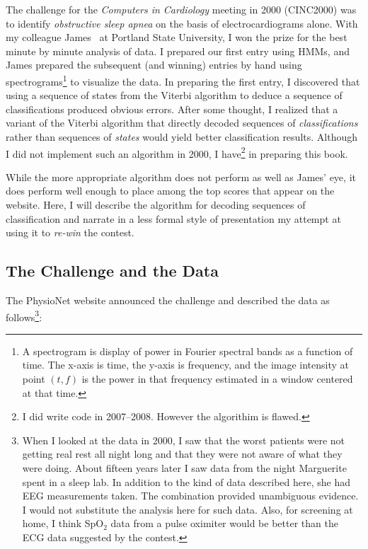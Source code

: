 \documentclass[]{article}
\begin{document}
The challenge for the \emph{Computers in Cardiology} meeting in 2000
(CINC2000) was to
identify \emph{obstructive sleep apnea} on the basis of
electrocardiograms alone.  With my colleague James~ at
Portland State University, I won the prize for the best minute by
minute analysis of data.  I prepared our first entry using HMMs, and
James prepared the subsequent (and winning) entries by hand using
spectrograms\footnote{A spectrogram is display of power in Fourier
  spectral bands as a function of time.  The x-axis is time, the
  y-axis is frequency, and the image intensity at point $(t,f)$ is the
  power in that frequency estimated in a window centered at that
  time.} to visualize the data. In preparing the
first entry, I discovered that using a sequence of states from the
Viterbi algorithm to deduce a sequence of classifications produced
obvious errors.  After some thought, I realized that a variant of the
Viterbi algorithm that directly decoded sequences of
\emph{classifications} rather than sequences of \emph{states} would
yield better classification results.  Although I did not implement
such an algorithm in 2000, I have\footnote{I did write code in
  2007--2008.  However the algorithim is flawed.} in preparing this
book.

While the more appropriate algorithm does not perform as well as
James' eye, it does perform well enough to place among the top scores
that appear on the~
website.  Here, I will describe the algorithm for decoding
sequences of classification and narrate in a less formal style of
presentation my attempt at using it to \emph{re-win} the contest.

\subsection{The  Challenge and the Data}\label{sec:challenge}

The PhysioNet website announced the challenge and described the data
as follows\footnote{When I looked at the data in 2000, I saw that the
  worst patients were not getting real rest all night long and that
  they were not aware of what they were doing.  About fifteen years
  later I saw data from the night Marguerite spent in a sleep lab.  In
  addition to the kind of data described here, she had EEG
  measurements taken.  The combination provided unambiguous evidence.
  I would not substitute the analysis here for such data.  Also, for
  screening at home, I think SpO$_2$ data from a pulse oximiter would
  be better than the ECG data suggested by the contest.}:
\end{document}
